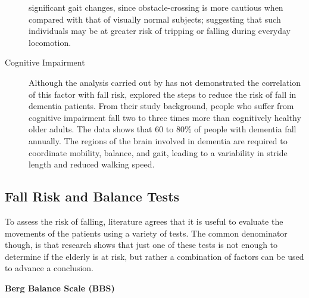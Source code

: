 \begin{description}
  significant gait changes, since obstacle-crossing is more cautious when compared with that of visually normal subjects; 
  suggesting that such individuals may be at greater risk of tripping or falling during everyday locomotion.
  \item[Cognitive Impairment] Although the analysis carried out by \cite{RiskFactors} has not demonstrated the correlation of this factor with fall risk, \cite{CognitiveRisk} explored the steps to reduce the risk of fall in dementia patients. From their study background, people who suffer from cognitive impairment fall two to three times more than cognitively healthy older adults. The data shows that 60 to 80\% of people with dementia fall annually. The regions of the brain involved in dementia are required to coordinate mobility, balance, and gait, leading to a variability in stride length and reduced walking speed.
\end{description}

\subsection{Fall Risk and Balance Tests}
To assess the risk of falling, literature agrees that it is useful to evaluate the movements of the patients using a variety of tests. The common denominator though, is that research shows that just one of these tests is not enough to determine if the elderly is at risk, but rather a combination of factors can be used to advance a conclusion.

\vspace{0.3cm}
\textbf{Berg Balance Scale (BBS)} %

